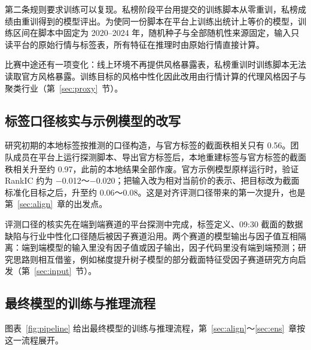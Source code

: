 \documentclass[UTF8,a4paper,zihao=-4,fontset=none]{ctexart}
\newcommand{\figref}[1]{图表~\ref{#1}}
\begin{document}
第二条规则要求训练可以复现。私榜阶段平台用提交的训练脚本从零重训，私榜成绩由重训得到的模型评出。为使同一份脚本在平台上训练出统计上等价的模型，训练区间在脚本中固定为 2020–2024 年，随机种子与全部随机性来源固定，输入只读平台的原始行情与标签表，所有特征在推理时由原始行情直接计算。

比赛中途还有一项变化：线上环境不再提供风格暴露表，私榜重训时训练脚本无法读取官方风格暴露。训练目标的风格中性化因此改用由行情计算的代理风格因子与聚类行业（第~\ref{sec:proxy}~节）。

\subsection{标签口径核实与示例模型的改写}

研究初期的本地标签按推测的口径构造，与官方标签的截面秩相关只有 0.56。团队成员在平台上运行探测脚本、导出官方标签后，本地重建标签与官方标签的截面秩相关升至约 0.97，此前的本地结果全部作废。官方示例模型原样运行时，验证 RankIC 约为 −0.012～−0.020；把输入改为相对当前价的表示、把目标改为截面标准化目标之后，升至约 0.06～0.08。这是对齐评测口径带来的第一次提升，也是第~\ref{sec:align}~章的出发点。

评测口径的核实先在端到端赛道的平台探测中完成，标签定义、09:30 截面的数据缺陷与行业中性化口径随后被因子赛道沿用。两个赛道的模型输出与因子值互相隔离：端到端模型的输入里没有因子值或因子输出，因子代码里没有端到端预测；研究思路则相互借鉴，例如梯度提升树子模型的部分截面特征受因子赛道研究方向启发（第~\ref{sec:input}~节）。

\subsection{最终模型的训练与推理流程}\label{sec:pipeline}

\figref{fig:pipeline} 给出最终模型的训练与推理流程，第~\ref{sec:align}～\ref{sec:ens}~章按这一流程展开。
\end{document}
